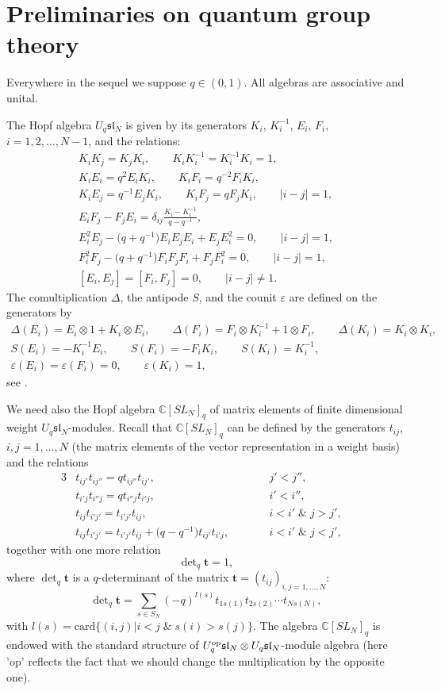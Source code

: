 \section{Preliminaries on quantum group theory}\label{sec_1}

Everywhere in the sequel we suppose $q\in(0,1)$. All algebras are associative and unital.

The Hopf algebra $U_q\mathfrak{sl}_{N}$ is given by its generators $K_i$, $K_i^{-1}$, $E_i$, $F_i$,
$i=1,2,\ldots,N-1$, and the relations:
\begin{gather*}
K_iK_j=K_jK_i,\qquad K_iK_i^{-1}=K_i^{-1}K_i=1,
\\
K_iE_i=q^2E_iK_i,\qquad K_iF_i=q^{-2}F_iK_i,
\\
K_iE_j=q^{-1}E_jK_i,\qquad K_iF_j=q F_jK_i, \qquad |i-j|=1,
\\
E_iF_j-F_jE_i=\delta_{ij}\frac{K_i-K_i^{-1}}{q-q^{-1}},
\\
E_i^2E_j-\big(q+q^{-1}\big)E_iE_jE_i+E_jE_i^2=0,\qquad|i-j|=1,
\\
F_i^2F_j-\big(q+q^{-1}\big)F_iF_jF_i+F_jF_i^2=0,\qquad|i-j|=1,
\\
[E_i,E_j]=[F_i,F_j]=0,\qquad|i-j|\ne 1.
\end{gather*}
 The comultiplication $\Delta$, the antipode $S$, and the counit
$\varepsilon$ are def\/ined on the generators by
\begin{gather*}
\Delta(E_i)=E_i\otimes 1+K_i\otimes E_i,\qquad \Delta(F_i)=F_i\otimes K_i^{-1}+1\otimes F_i,\qquad
\Delta(K_i)=K_i\otimes K_i,
\\
S(E_i)=-K_i^{-1}E_i,\qquad S(F_i)=-F_iK_i,\qquad S(K_i)=K_i^{-1},
\\
\varepsilon(E_i)=\varepsilon(F_i)=0,\qquad\varepsilon(K_i)=1,
\end{gather*} see \cite[Chapter 4]{Jant}.

We need also the Hopf algebra $\mathbb{C}[SL_{N}]_q$ of matrix elements of f\/inite dimensional weight
$U_q\mathfrak{sl}_{N}$-modules. Recall that $\mathbb{C}[SL_{N}]_q$ can be def\/ined by the generators $t_{ij}$,
$i,j=1,\dots,N$ (the matrix elements of the vector representation in a weight basis) and the relations
\begin{alignat*}{3}
&t_{ij'}t_{ij''}=qt_{ij''}t_{ij'},\qquad && j'<j'',&
\\ &t_{i'j}t_{i''j}=qt_{i''j}t_{i'j},\qquad && i'<i'',&
\\ &t_{ij}t_{i'j'}=t_{i'j'}t_{ij},\qquad && i<i'\;\&\;j>j', &
\\ &t_{ij}t_{i'j'}=t_{i'j'}t_{ij}+\big(q-q^{-1}\big)t_{ij'}t_{i'j},\qquad
&& i<i'\;\&\; j<j',&
\end{alignat*}
together with one more relation
\[
\det\nolimits_q\mathbf{t}=1,
\]
where $\det\nolimits_q\mathbf{t}$ is a $q$-determinant of the matrix $\mathbf{t}=(t_{ij})_{i,j=1,\dots,N}$:
\[
\det\nolimits_q\mathbf{t}=\sum\limits_{s\in S_{N}}(-q)^{l(s)}t_{1 s(1)} t_{2s(2)}\cdots t_{Ns(N)},
\]
with $l(s)=\mathrm{card}\{(i,j)|i<j\;\&\;s(i)>s(j)\}$. The algebra $\mathbb C[SL_N]_q$ is endowed with the
standard structure of $U_q^{\rm op}\mathfrak{sl}_N \otimes U_q \mathfrak{sl}_N$-module algebra (here 'op'
ref\/lects the fact that we should change the multiplication by the opposite one).


